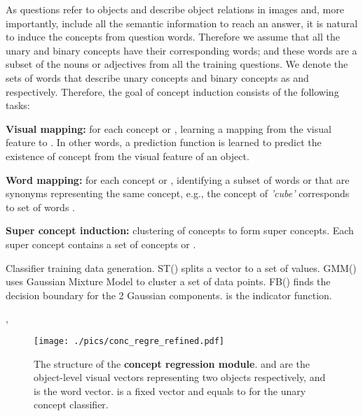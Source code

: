 \documentclass[10pt,twocolumn,letterpaper]{article}
\begin{document}
As questions refer to objects and describe object relations in images and, more importantly, include all the semantic information to reach an answer, it is natural to induce the concepts from question words. Therefore we assume that all the unary and binary concepts have their corresponding words; and these words are a subset of the nouns or adjectives from all the training questions. We denote the sets of words that describe unary concepts and binary concepts as  and  respectively. Therefore, the goal of concept induction consists of the following tasks:

\noindent \textbf{Visual mapping:} for each concept  or , learning a mapping from the visual feature  to . In other words, a prediction function  is learned to predict the existence of concept  from the visual feature  of an object.

\noindent \textbf{Word mapping:} for each concept  or , identifying a subset of words  or  that are synonyms representing the same concept, e.g., the concept of \emph{'cube'} corresponds to set of words .

\noindent \textbf{Super concept induction:} clustering of concepts to form super concepts. Each super concept  contains a set of concepts   or .







\begin{algorithm}[t!]
\SetAlgoLined
\small
 \caption{\small{Classifier training data generation. ST() splits a vector  to a set of  values. GMM() uses Gaussian Mixture Model to cluster a set of data points. FB() finds the decision boundary for the 2 Gaussian components.  is the indicator function.}}
 \label{dp_gen}
\KwResult{, }
 , \\
 \For{}{, } 
\end{algorithm}



\begin{figure}[t!]
\centering
\texttt{[image: ./pics/conc\_regre\_refined.pdf]}
\caption{\small{The structure of the \textbf{concept regression module}.  and  are the object-level visual vectors representing two objects respectively, and  is the word vector.  is a fixed vector and  equals to  for the unary concept classifier.}}
\label{conc_regre}
\vspace{-5mm}
\end{figure}
\end{document}

